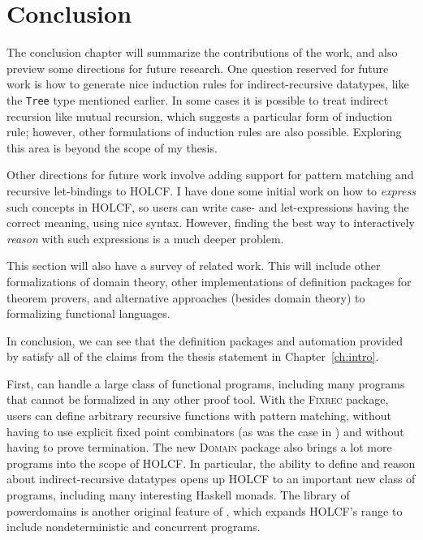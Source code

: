 \chapter{Conclusion}
\label{ch:conclusion}

The conclusion chapter will summarize the contributions of the work, and also preview some directions for future research.  One question reserved for future work is how to generate nice induction rules for indirect-recursive datatypes, like the \texttt{Tree} type mentioned earlier.  In some cases it is possible to treat indirect recursion like mutual recursion, which suggests a particular form of induction rule; however, other formulations of induction rules are also possible.  Exploring this area is beyond the scope of my thesis.

Other directions for future work involve adding support for pattern matching and recursive let-bindings to HOLCF.  I have done some initial work on how to \emph{express} such concepts in HOLCF, so users can write case- and let-expressions having the correct meaning, using nice syntax.  However, finding the best way to interactively \emph{reason} with such expressions is a much deeper problem.

This section will also have a survey of related work.  This will include other formalizations of domain theory, other implementations of definition packages for theorem provers, and alternative approaches (besides domain theory) to formalizing functional languages.

In conclusion, we can see that the definition packages and automation provided by  satisfy all of the claims from the thesis statement in Chapter~\ref{ch:intro}. 

First,  can handle a large class of functional programs, including many programs that cannot be formalized in any other proof tool. With the \textsc{Fixrec} package, users can define arbitrary recursive functions with pattern matching, without having to use explicit fixed point combinators (as was the case in ) and without having to prove termination. The new \textsc{Domain} package also brings a lot more programs into the scope of HOLCF. In particular, the ability to define and reason about indirect-recursive datatypes opens up HOLCF to an important new class of programs, including many interesting Haskell monads. The library of powerdomains is another original feature of , which expands HOLCF's range to include nondeterministic and concurrent programs.

